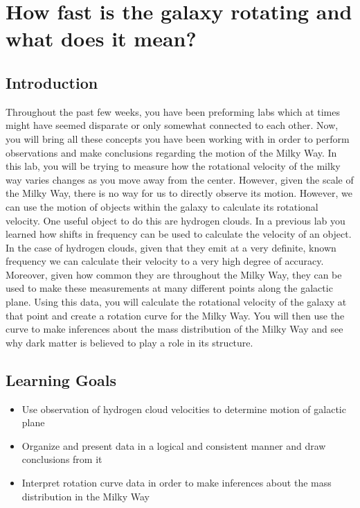 \chapter{How fast is the galaxy rotating and what does it mean?}

\section{Introduction}
Throughout the past few weeks, you have been preforming labs which at times might have seemed disparate or only somewhat connected to each other. Now, you will bring all these concepts you have been working with in order to perform observations and make conclusions regarding the motion of the Milky Way. In this lab, you will be trying to measure how the rotational velocity of the milky way varies changes as you move away from the center. However, given the scale of the Milky Way, there is no way for us to directly observe its motion. However, we can use the motion of objects within the galaxy to calculate its rotational velocity. One useful object to do this are hydrogen clouds. In a previous lab you learned how shifts in frequency can be used to calculate the velocity of an object. In the case of hydrogen clouds, given that they emit at a very definite, known frequency we can calculate their velocity to a very high degree of accuracy. Moreover, given how common they are throughout the Milky Way, they can be used to make these measurements at many different points along the galactic plane. Using this data, you will calculate the rotational velocity of the galaxy at that point and create a rotation curve for the Milky Way. You will then use the curve to make inferences about the mass distribution of the Milky Way and see why dark matter is believed to play a role in its structure. 

\section{Learning Goals}
\begin{itemize}
	\item Use observation of hydrogen cloud velocities to determine motion of galactic plane
	
	\item Organize and present data in a logical and consistent manner and draw conclusions from it
	
	\item Interpret rotation curve data in order to make inferences about the mass distribution in the Milky Way
\end{itemize}

